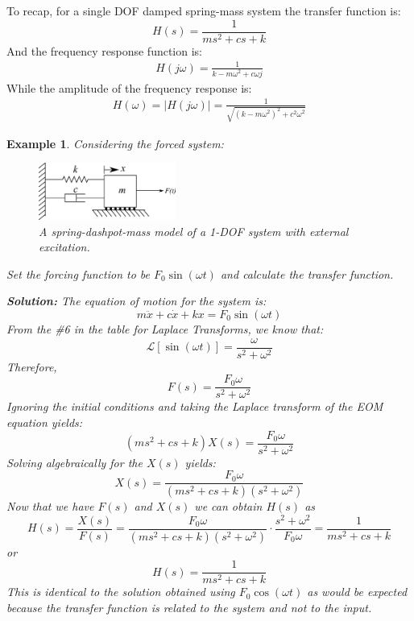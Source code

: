 \documentclass[12pt,letter]{article}
\newtheorem{ex}{Example}
\numberwithin{ex}{section} %
\newenvironment{example}{\begin{mdframed}[middlelinewidth=0.5mm]\begin{ex}\normalfont}{\end{ex}\end{mdframed}}
\numberwithin{re}{section} %
\newcommand{\Laplace}[1]{\ensuremath{\mathcal{L}{\left[#1\right]}}}
\begin{document}
To recap, for a single DOF damped spring-mass system the transfer function is:
\begin{equation}
H(s) = \frac{1}{ms^2+cs+k}
\end{equation}
And the frequency response function is:
\begin{eqnarray}
H(j\omega) = \frac{1}{k-m\omega^2+c\omega j}
\end{eqnarray}
While the amplitude of the frequency response is:
\begin{eqnarray}
H(\omega) = |H(j\omega)| = \frac{1}{\sqrt{(k-m\omega^2)^2+c^2\omega^2}}
\end{eqnarray}

\begin{example}
	Considering the forced system:
	\begin{figure}[H]
		\centering
		\includegraphics[width=0.4\textwidth]{../Figures/forced_spring_mass_damper_system.png}
		\caption{A spring-dashpot-mass model of a 1-DOF system with external excitation.}
	\end{figure}
	Set the forcing function to be $F_0 \sin(\omega t)$ and calculate the transfer function. 
	
	\noindent\textbf{Solution:} The equation of motion for the system is:
	\begin{equation}
		m\ddot{x} + c\dot{x} +kx = F_0 \sin(\omega t)
	\end{equation}
	From the \#6 in the table for Laplace Transforms, we know that:
	\begin{equation}
		\Laplace{\sin(\omega t)} = \frac{\omega}{s^2+\omega^2}
	\end{equation}
	Therefore, 
	\begin{equation}
	F(s) = \frac{F_0\omega}{s^2+\omega^2}
	\end{equation}
	Ignoring the initial conditions and taking the Laplace transform of the EOM equation yields:
	\begin{equation}
	(ms^2 + cs +k)X(s) = \frac{F_0 \omega}{s^2+\omega^2} 
	\end{equation}
	Solving algebraically for the $X(s)$ yields: 
	\begin{equation}
	X(s) = \frac{F_0\omega}{(ms^2 + cs +k)(s^2+\omega^2)}
	\end{equation}
	Now that we have $F(s)$ and $X(s)$ we can obtain $H(s)$ as  
	\begin{equation}
	H(s) = \frac{X(s)}{F(s)} = \frac{F_0 \omega }{(ms^2 + cs +k)(s^2+\omega^2)} \cdot \frac{s^2+\omega^2}{F_0 \omega} = \frac{1}{ms^2+cs+k}
	\end{equation}
	or 
	\begin{equation}
	H(s) = \frac{1}{ms^2+cs+k}
	\end{equation}
	This is identical to the solution obtained using $F_0 \cos(\omega t)$ as would be expected because the transfer function is related to the system and not to the input. 
\end{example}  
\end{document}
